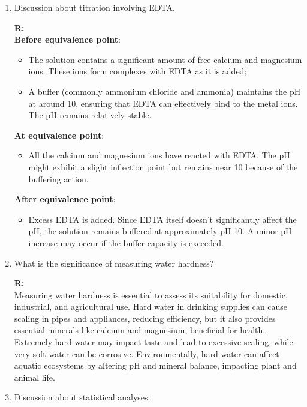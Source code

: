 \documentclass{article}
\begin{document}
\begin{enumerate}
    \item Discussion about titration involving EDTA.

        \textbf{R:\\}
        \textbf{Before equivalence point}:
        \begin{itemize}
            \item The solution contains a significant amount of free calcium and magnesium ions. These ions form complexes with EDTA as it is added;
            \item A buffer (commonly ammonium chloride and ammonia) maintains the pH at around 10, ensuring that EDTA can effectively bind to the metal ions. The pH remains relatively stable.      
        \end{itemize}

        \textbf{At equivalence point}:
        \begin{itemize}
            \item All the calcium and magnesium ions have reacted with EDTA. The pH might exhibit a slight inflection point but remains near 10 because of the buffering action.
        \end{itemize}

        \textbf{After equivalence point}:
        \begin{itemize}
            \item Excess EDTA is added. Since EDTA itself doesn’t significantly affect the pH, the solution remains buffered at approximately pH 10. A minor pH increase may occur if the buffer capacity is exceeded.
        \end{itemize}

    \item What is the significance of measuring water hardness?

        \textbf{R:\\}
        Measuring water hardness is essential to assess its suitability for domestic,
        industrial, and agricultural use. Hard water in drinking supplies can cause
        scaling in pipes and appliances, reducing efficiency, but it also provides
        essential minerals like calcium and magnesium, beneficial for health. Extremely
        hard water may impact taste and lead to excessive scaling, while very soft water
        can be corrosive. Environmentally, hard water can affect aquatic ecosystems by
        altering pH and mineral balance, impacting plant and animal life.
    
    \item Discussion about statistical analyses:
    

\end{enumerate}
\end{document}
